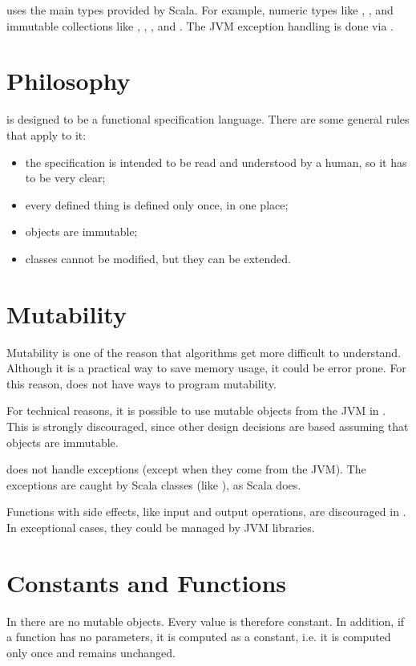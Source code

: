 \Soda uses the main types provided by Scala.
For example, numeric types like , , and immutable collections like , , , and .
The JVM exception handling is done via .


\section{Philosophy}

\Soda is designed to be a functional specification language.
There are some general rules that apply to it:

\begin{itemize}
    \item the specification is intended to be read and understood by a human, so it has to be very clear;
    \item every defined thing is defined only once, in one place;
    \item objects are immutable;
    \item classes cannot be modified, but they can be extended.
\end{itemize}


\section{Mutability}

Mutability is one of the reason that algorithms get more difficult to understand.
Although it is a practical way to save memory usage, it could be error prone.
For this reason, \Soda does not have ways to program mutability.

For technical reasons, it is possible to use mutable objects from the JVM in \Soda.
This is strongly discouraged, since other design decisions are based assuming that objects are immutable.

\Soda does not handle exceptions (except when they come from the JVM).
The exceptions are caught by Scala classes (like ), as Scala does.

Functions with side effects, like input and output operations, are discouraged in \Soda.
In exceptional cases, they could be managed by JVM libraries.


\section{Constants and Functions}

In \Soda there are no mutable objects.
Every value is therefore constant.
In addition, if a function has no parameters, it is computed as a constant, i.e. it is computed only once and remains unchanged.

